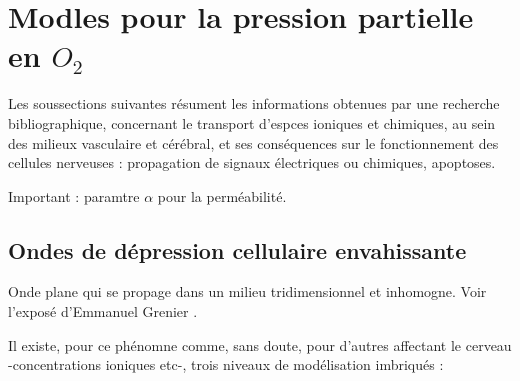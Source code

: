 \section{Modles pour la pression partielle en $O_2$}\label{smod}

Les soussections suivantes r\'esument les informations obtenues par une recherche bibliographique, concernant le transport d'espces ioniques et chimiques, %
au sein des milieux vasculaire et c\'er\'ebral, et ses cons\'equences sur le fonctionnement des cellules nerveuses : propagation de signaux \'electriques ou chimiques, apoptoses.

\ligneinter
Important : paramtre $\alpha$ pour la perm\'eabilit\'e.

\subsection{Ondes de d\'epression cellulaire envahissante}

Onde plane qui se propage dans un milieu tridimensionnel et inhomogne. Voir l'expos\'e d'Emmanuel Grenier \cite{gredp}.

Il existe, pour ce ph\'enomne comme, sans doute, pour d'autres affectant le cerveau -concentrations ioniques etc-, trois niveaux de mod\'elisation imbriqu\'es :

